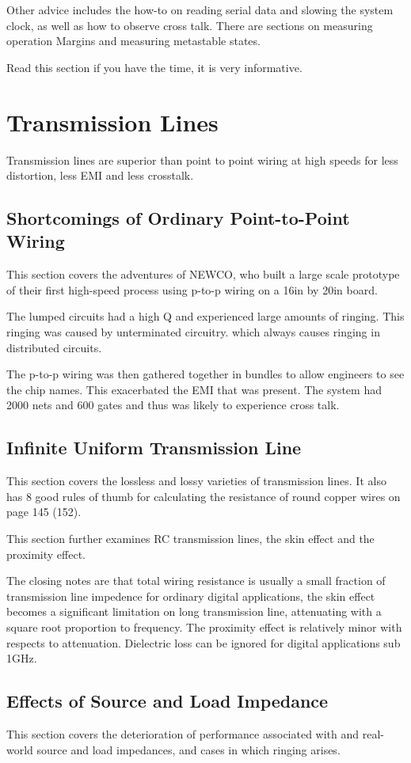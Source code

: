 \documentclass{article}
\begin{document}
	Other advice includes the how-to on reading serial data and slowing the system clock, as well as how to observe cross talk. There are sections on measuring operation Margins and measuring metastable states.
	
	Read this section if you have the time, it is very informative.
	\section{Transmission Lines}
	Transmission lines are superior than point to point wiring at high speeds for less distortion, less EMI and less crosstalk.
	\subsection{Shortcomings of Ordinary Point-to-Point Wiring}
	This section covers the adventures of NEWCO, who built a large scale prototype of their first high-speed process using p-to-p wiring on a 16in by 20in board.
	
	The lumped circuits had a high Q and experienced large amounts of ringing. This ringing was caused by unterminated circuitry. which always causes ringing in distributed circuits.
	
	The p-to-p wiring was then gathered together in bundles to allow engineers to see the chip names. This exacerbated the EMI that was present. The system had 2000 nets and 600 gates and thus was likely to experience cross talk.
	\subsection{Infinite Uniform Transmission Line}
	This section covers the lossless and lossy varieties of transmission lines. It also has 8 good rules of thumb for calculating the resistance of round copper wires on page 145 (152).
	
	This section further examines RC transmission lines, the skin effect and the proximity effect.
	
	The closing notes are that total wiring resistance is usually a small fraction of transmission line impedence for ordinary digital applications, the skin effect becomes a significant limitation on long transmission line, attenuating with a square root proportion to frequency. The proximity effect is relatively minor with respects to attenuation. Dielectric loss can be ignored for digital applications sub 1GHz.
	\subsection{Effects of Source and Load Impedance}
	This section covers the deterioration of performance associated with and real-world source and load impedances, and cases in which ringing arises.
\end{document}
